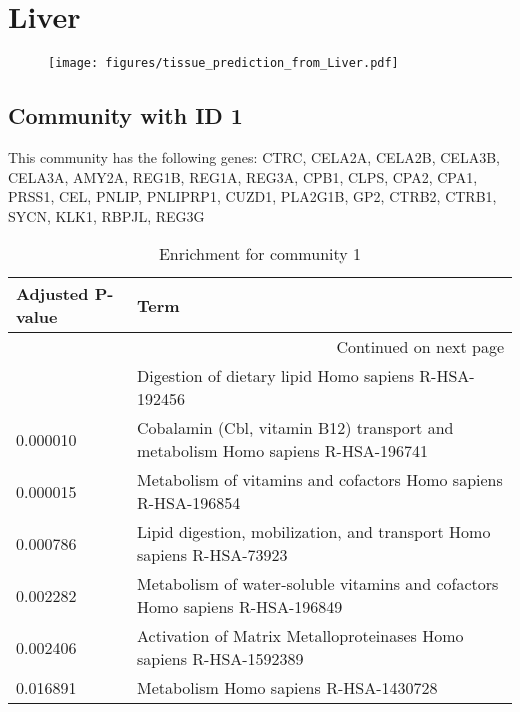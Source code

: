 
\section*{Liver}
\begin{figure}[h!]
\centering
\texttt{[image: figures/tissue\_prediction\_from\_Liver.pdf]}
\end{figure}



\subsection*{Community with ID 1}
This community has the following genes: CTRC, CELA2A, CELA2B, CELA3B, CELA3A, AMY2A, REG1B, REG1A, REG3A, CPB1, CLPS, CPA2, CPA1, PRSS1, CEL, PNLIP, PNLIPRP1, CUZD1, PLA2G1B, GP2, CTRB2, CTRB1, SYCN, KLK1, RBPJL, REG3G
\\
\begin{longtable}{p{2.4cm}p{14.5cm}}
\caption{Enrichment for community 1}\\
\toprule
Adjusted \newline P-value &                                                                             Term \\
\midrule
\endhead
\midrule
\multicolumn{2}{r}{{Continued on next page}} \\
\midrule
\endfoot

\bottomrule
\endlastfoot
                 0.000008 &                             Digestion of dietary lipid Homo sapiens R-HSA-192456 \\
                 0.000010 &  Cobalamin (Cbl, vitamin B12) transport and metabolism Homo sapiens R-HSA-196741 \\
                 0.000015 &                   Metabolism of vitamins and cofactors Homo sapiens R-HSA-196854 \\
                 0.000786 &            Lipid digestion, mobilization, and transport Homo sapiens R-HSA-73923 \\
                 0.002282 &     Metabolism of water-soluble vitamins and cofactors Homo sapiens R-HSA-196849 \\
                 0.002406 &               Activation of Matrix Metalloproteinases Homo sapiens R-HSA-1592389 \\
                 0.016891 &                                            Metabolism Homo sapiens R-HSA-1430728 \\
\end{longtable}


